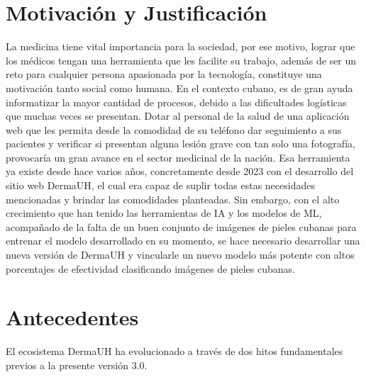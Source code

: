 \section{Motivaci\'on y Justificaci\'on}
La medicina tiene vital importancia para la sociedad, por ese motivo,
lograr que los m\'edicos tengan una herramienta que les facilite su trabajo,
adem\'as de ser un reto para cualquier persona apasionada por la tecnolog\'ia, constituye una
motivaci\'on tanto social como humana. En el contexto cubano, es de gran ayuda informatizar la mayor
cantidad de procesos, debido a las dificultades log\'isticas que muchas veces se presentan.
Dotar al personal de la salud de una aplicaci\'on web que les permita desde la comodidad de su 
tel\'efono dar seguimiento a sus pacientes y verificar si presentan alguna lesi\'on grave con tan
solo una fotograf\'ia, provocar\'ia un gran avance en el sector medicinal de la naci\'on.
Esa herramienta ya existe desde hace varios a\~nos, concretamente desde 2023 con el desarrollo
del sitio web DermaUH, el cual era capaz de suplir todas estas necesidades mencionadas y brindar las 
comodidades planteadas. Sin embargo, con el alto crecimiento que han tenido las herramientas de IA 
y los modelos de ML, acompa\~nado de la falta de un buen conjunto de im\'agenes de pieles cubanas para entrenar
el modelo desarrollado en su momento, se hace necesario desarrollar una nueva versi\'on de DermaUH y 
vincularle un nuevo modelo m\'as potente con altos porcentajes de efectividad clasificando im\'agenes
de pieles cubanas.

\section{Antecedentes}

El ecosistema DermaUH ha evolucionado a través de dos hitos fundamentales previos a la presente versión 3.0.

